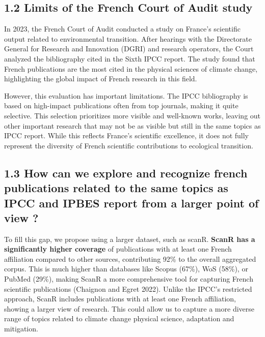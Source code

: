 \documentclass[
]{article}
\begin{document}
\hypertarget{limits-of-the-french-court-of-audit-study}{%
\subsection{1.2 Limits of the French Court of Audit
study}\label{limits-of-the-french-court-of-audit-study}}

In 2023, the French Court of Audit conducted a study on France's
scientific output related to environmental transition. After hearings
with the Directorate General for Research and Innovation (DGRI) and
research operators, the Court analyzed the bibliography cited in the
Sixth IPCC report. The study found that French publications are the most
cited in the physical sciences of climate change, highlighting the
global impact of French research in this field.

However, this evaluation has important limitations. The IPCC
bibliography is based on high-impact publications often from top
journals, making it quite selective. This selection prioritizes more
visible and well-known works, leaving out other important research that
may not be as visible but still in the same topics as IPCC report. While
this reflects France's scientific excellence, it does not fully
represent the diversity of French scientific contributions to ecological
transition.

\hypertarget{how-can-we-explore-and-recognize-french-publications-related-to-the-same-topics-as-ipcc-and-ipbes-report-from-a-larger-point-of-view}{%
\subsection{1.3 How can we explore and recognize french publications
related to the same topics as IPCC and IPBES report from a larger point
of view
?}\label{how-can-we-explore-and-recognize-french-publications-related-to-the-same-topics-as-ipcc-and-ipbes-report-from-a-larger-point-of-view}}

To fill this gap, we propose using a larger dataset, such as scanR.
\textbf{ScanR has a significantly higher coverage} of publications with
at least one French affiliation compared to other sources, contributing
92\% to the overall aggregated corpus. This is much higher than
databases like Scopus (67\%), WoS (58\%), or PubMed (29\%), making ScanR
a more comprehensive tool for capturing French scientific publications
(Chaignon and Egret 2022). Unlike the IPCC's restricted approach, ScanR
includes publications with at least one French affiliation, showing a
larger view of research. This could allow us to capture a more diverse
range of topics related to climate change physical science, adaptation
and mitigation.
\end{document}
